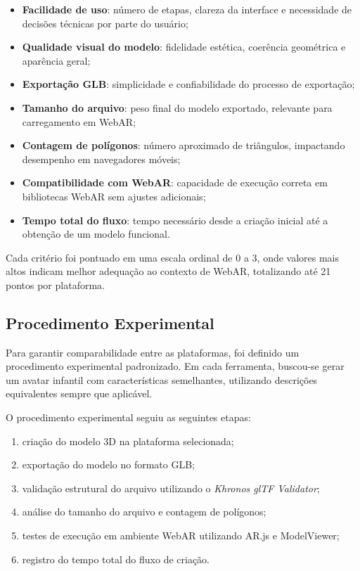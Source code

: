 \documentclass[conference]{IEEEtran}
\begin{document}
\begin{itemize}
    \item \textbf{Facilidade de uso}: número de etapas, clareza da interface e necessidade de decisões técnicas por parte do usuário;
    \item \textbf{Qualidade visual do modelo}: fidelidade estética, coerência geométrica e aparência geral;
    \item \textbf{Exportação GLB}: simplicidade e confiabilidade do processo de exportação;
    \item \textbf{Tamanho do arquivo}: peso final do modelo exportado, relevante para carregamento em WebAR;
    \item \textbf{Contagem de polígonos}: número aproximado de triângulos, impactando desempenho em navegadores móveis;
    \item \textbf{Compatibilidade com WebAR}: capacidade de execução correta em bibliotecas WebAR sem ajustes adicionais;
    \item \textbf{Tempo total do fluxo}: tempo necessário desde a criação inicial até a obtenção de um modelo funcional.
\end{itemize}

Cada critério foi pontuado em uma escala ordinal de 0 a 3, onde valores mais altos indicam melhor adequação ao contexto de WebAR, totalizando até 21 pontos por plataforma.

\subsection{Procedimento Experimental}

Para garantir comparabilidade entre as plataformas, foi definido um procedimento experimental padronizado. Em cada ferramenta, buscou-se gerar um avatar infantil com características semelhantes, utilizando descrições equivalentes sempre que aplicável.

O procedimento experimental seguiu as seguintes etapas:

\begin{enumerate}
    \item criação do modelo 3D na plataforma selecionada;
    \item exportação do modelo no formato GLB;
    \item validação estrutural do arquivo utilizando o \textit{Khronos glTF Validator};
    \item análise do tamanho do arquivo e contagem de polígonos;
    \item testes de execução em ambiente WebAR utilizando AR.js e ModelViewer;
    \item registro do tempo total do fluxo de criação.
\end{enumerate}
\end{document}
